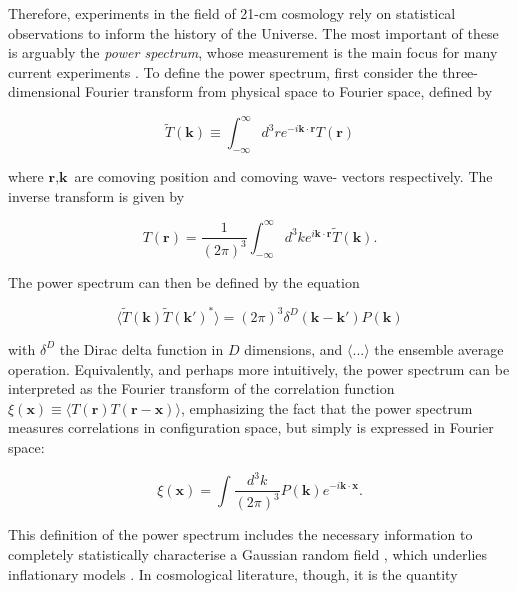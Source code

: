 \documentclass[floats,floatfix,showpacs,amssymb,prd,superscriptaddress,nofootinbib]{revtex4-2} %
\begin{document}
Therefore, experiments in the field of 21-cm cosmology rely on statistical observations to inform the history of the Universe. The most important of these is arguably the \textit{power spectrum}, whose measurement is the main focus for many current experiments \citep{DeBoer_2017}. To define the power spectrum, first consider the three-dimensional Fourier transform from physical space to Fourier space, defined by

\begin{equation}
    \tilde{T} (\textbf{k}) \equiv \int^\infty _{-\infty} d^3 r e^{-i\textbf{k} \cdot \textbf{r}} T(\textbf{r})
\end{equation}

\noindent where $\textbf{r}, \textbf{k}$ are comoving position and comoving wave- vectors respectively. The inverse transform is given by 

\begin{equation}
    T(\textbf{r}) = \frac{1}{(2 \pi)^3} \int^\infty _{-\infty} d^3 k e^{i \textbf{k} \cdot \textbf{r}} \tilde{T}(\textbf{k}).
\end{equation}

The power spectrum can then be defined by the equation

\begin{equation}
    \langle \tilde{T} (\textbf{k}) \tilde{T} (\textbf{k}') ^{*} \rangle = (2 \pi)^3 \delta^{D}  (\textbf{k} - \textbf{k}') P(\textbf{k})
\end{equation}

\noindent with $\delta^D$ the Dirac delta function in $D$ dimensions, and $\langle ... \rangle$ the ensemble average operation. Equivalently, and perhaps more intuitively, the power spectrum can be interpreted as the Fourier transform of the correlation function $\xi(\textbf{x}) \equiv \langle T(\textbf{r}) T(\textbf{r} - \textbf{x}) \rangle$, emphasizing the fact that the power spectrum measures correlations in configuration space, but simply is expressed in Fourier space:

\begin{equation}
    \xi(\textbf{x}) = \int \frac{d^3 k}{(2 \pi)^3} P(\textbf{k}) e^{-i \textbf{k} \cdot \textbf{x}}.
\end{equation}

This definition of the power spectrum includes the necessary information to completely statistically characterise a Gaussian random field \citep{Coles_2001}, which underlies inflationary models \citep{Guth_Pi_1982, Brandenberger_1985}. In cosmological literature, though, it is the quantity 
\end{document}
